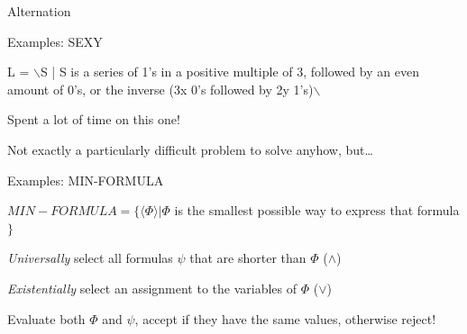 \documentclass[presentation]{beamer}
\begin{document}
\begin{frame}[label={sec:orgf916c10}]{Alternation}
\begin{block}{Examples: SEXY}
\begin{block}{L = $\backslash${S | S is a series of 1's in a positive multiple of 3, followed by an even amount of 0's, or the inverse (3x 0's followed by 2y 1's)$\backslash$}}
\end{block}
\begin{block}{Spent a lot of time on this one!}
\end{block}
\begin{block}{Not exactly a particularly difficult problem to solve anyhow, but\ldots{}}
\end{block}
\end{block}

\begin{block}{Examples: MIN-FORMULA}
\begin{block}{\(MIN-FORMULA = \{\langle \Phi \rangle | \Phi\) is the smallest possible way to express that formula\(\}\)}
\begin{block}{\emph{Universally} select all formulas \(\psi\) that are shorter than \(\Phi\) (\(\land\))}
\end{block}
\begin{block}{\emph{Existentially} select an assignment to the variables of \(\Phi\) (\(\lor\))}
\end{block}
\begin{block}{Evaluate both \(\Phi\) and \(\psi\), accept if they have the same values, otherwise reject!}
\end{block}
\end{block}
\end{block}
\end{frame}
\end{document}

